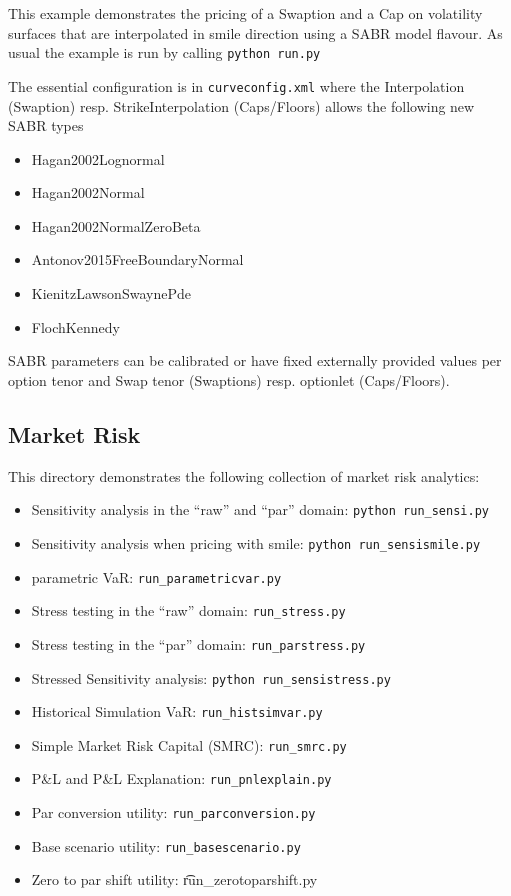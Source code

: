 This example demonstrates the pricing of a Swaption and a Cap on
volatility surfaces that are interpolated in smile direction using a SABR
model flavour. As usual the example is run by calling {\tt python run.py}

The essential configuration is in {\tt curveconfig.xml} where the
Interpolation (Swaption) resp. StrikeInterpolation (Caps/Floors) allows
the following new SABR types
\begin{itemize}
\item Hagan2002Lognormal
\item Hagan2002Normal
\item Hagan2002NormalZeroBeta
\item Antonov2015FreeBoundaryNormal
\item KienitzLawsonSwaynePde
\item FlochKennedy
\end{itemize}

SABR parameters can be calibrated or have fixed externally provided values
per option tenor and Swap tenor (Swaptions) resp. optionlet (Caps/Floors).

\subsection{Market Risk}\label{example:marketrisk}

This directory demonstrates the following collection of market risk analytics:
\begin{itemize}
\item Sensitivity analysis in the ``raw'' and ``par'' domain: {\tt python run\_sensi.py}
\item Sensitivity analysis when pricing with smile: {\tt python run\_sensismile.py}
\item parametric VaR: {\tt run\_parametricvar.py}
\item Stress testing in the ``raw'' domain: {\tt run\_stress.py}
\item Stress testing in the ``par'' domain: {\tt run\_parstress.py}
\item Stressed Sensitivity analysis: {\tt python run\_sensistress.py}
\item Historical Simulation VaR: {\tt run\_histsimvar.py}
\item Simple Market Risk Capital (SMRC): {\tt run\_smrc.py}
\item P\&L and P\&L Explanation: {\tt run\_pnlexplain.py}
\item Par conversion utility: {\tt run\_parconversion.py}
\item Base scenario utility: {\tt run\_basescenario.py}
\item Zero to par shift utility: {\t run\_zerotoparshift.py}
\end{itemize}

